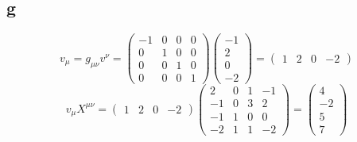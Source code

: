 \documentclass{article}
\begin{document}
\subsection*{g}
\[
	v_\mu = g_{\mu\nu} v^\nu
	= \begin{pmatrix}
		-1 & 0 & 0 & 0 \\
		0 & 1 & 0 & 0 \\
		0 & 0 & 1 & 0 \\
		0 & 0 & 0 & 1
	\end{pmatrix}
	\begin{pmatrix}
		-1 \\ 2 \\ 0 \\ -2
	\end{pmatrix}
	= 	\begin{pmatrix}
		1 & 2 & 0 & -2
	\end{pmatrix}
\]
\[
	v_\mu X^{\mu\nu}
	= 	\begin{pmatrix}
		1 & 2 & 0 & -2
	\end{pmatrix}
	\begin{pmatrix}
		2 & 0 & 1 & -1 \\
		-1 & 0 & 3 & 2 \\
		-1 & 1 & 0 & 0 \\
		-2 & 1 & 1 & -2
	\end{pmatrix}
	= \begin{pmatrix}
		4 \\ -2 \\ 5 \\ 7
	\end{pmatrix}
\]
\end{document}
